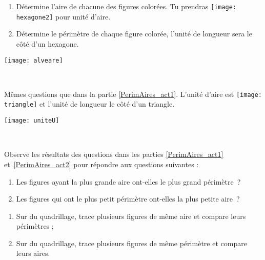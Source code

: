 \begin{activite}[Comparaisons]

\begin{partie} \label{PerimAires_act1}
\begin{minipage}[c]{0.65\linewidth}
\begin{enumerate}
 \item Détermine l'aire de chacune des figures colorées. Tu prendras \texttt{[image: hexagone2]} pour unité d'aire.
 \item Détermine le périmètre de chaque figure colorée, l'unité de longueur sera le côté d'un hexagone.
 \end{enumerate}
 \end{minipage} \hfill%
 \begin{minipage}[c]{0.3\linewidth}
  \texttt{[image: alveare]}
  \end{minipage} \\
\end{partie}

\begin{partie} \label{PerimAires_act2}
\begin{minipage}[c]{0.5\linewidth}
Mêmes questions que dans la partie \ref{PerimAires_act1}. L'unité d'aire est \texttt{[image: triangle]} et l'unité de longueur le côté d'un triangle.
 \end{minipage} \hfill%
 \begin{minipage}[c]{0.46\linewidth}
  \texttt{[image: uniteU]}
  \end{minipage} \\
\end{partie}

\begin{partie}
Observe les résultats des questions dans les parties \ref{PerimAires_act1} et \ref{PerimAires_act2} pour répondre aux questions suivantes :
\begin{enumerate}
 \item Les figures ayant la plus grande aire ont‑elles le plus grand périmètre ?
 \item Les figures qui ont le plus petit périmètre ont‑elles la plus petite aire ?
 \end{enumerate}
\end{partie}

\begin{partie}
\begin{enumerate}
 \item Sur du quadrillage, trace plusieurs figures de même aire et compare leurs périmètres ;
 \item Sur du quadrillage, trace plusieurs figures de même périmètre et compare leurs aires.
 \end{enumerate}
\end{partie}


\end{activite}
